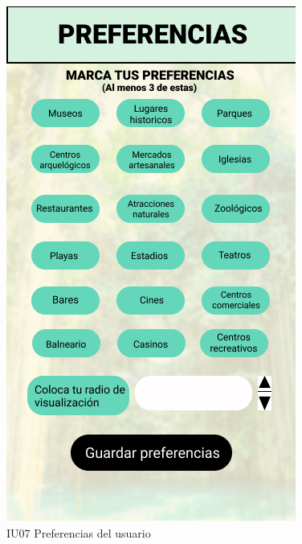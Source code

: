 \begin{figure}[h]
    \begin{minipage}{0.5\textwidth}
        \centering
        \includegraphics[width=.7\linewidth]{Pantallas Prototipo3/IU07-Preferencias del usuario.jpg}
        \caption{IU07 Preferencias del usuario}
    \end{minipage}
    

\end{figure}
